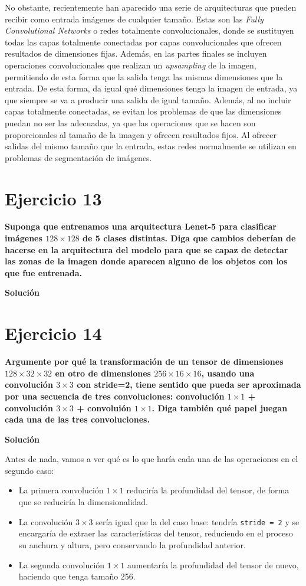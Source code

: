 \documentclass[11pt,a4paper]{article}
\newcommand{\answer}{\noindent\textbf{Solución}}
\newcommand{\question}[1]{\noindent\textbf{#1}}
\newcommand{\nonumsection}[1]{\section*{#1}\addcontentsline{toc}{section}{#1}}
\begin{document}
No obstante, recientemente han aparecido una serie de arquitecturas que pueden
recibir como entrada imágenes de cualquier tamaño. Estas son las \textit{Fully
Convolutional Networks} \cite{fcn} o redes totalmente convolucionales, donde se
sustituyen todas las capas totalmente conectadas por capas convolucionales que
ofrecen resultados de dimensiones fijas. Además,
en las partes finales se incluyen operaciones convolucionales que realizan un
\textit{upsampling} de la imagen, permitiendo de esta forma que la salida tenga las mismas
dimensiones que la entrada. De esta forma, da igual qué dimensiones tenga la imagen
de entrada, ya que siempre se va a producir una salida de igual tamaño.
Además, al no incluir capas totalmente conectadas, se evitan los problemas
de que las dimensiones puedan no ser las adecuadas, ya que las operaciones
que se hacen son proporcionales al tamaño de la imagen y ofrecen resultados
fijos. Al ofrecer salidas del mismo tamaño que la entrada, estas redes
normalmente se utilizan en problemas de segmentación de imágenes.

\nonumsection{Ejercicio 13}

\question{Suponga que entrenamos una arquitectura Lenet-5 para clasificar
imágenes $128 \times 128$ de 5 clases distintas. Diga que cambios deberían de
hacerse en la arquitectura del modelo para que se capaz de detectar
las zonas de la imagen donde aparecen alguno de los objetos con los
que fue entrenada.}

\answer

\nonumsection{Ejercicio 14}

\question{Argumente por qué la transformación de un tensor de dimensiones
$128 \times 32 \times 32$ en otro de dimensiones $256 \times 16 \times 16$,
usando una convolución $3 \times 3$ con stride=2, tiene sentido que pueda
ser aproximada por una secuencia de tres convoluciones: convolución $1 \times 1$
+ convolución $3 \times 3$ + convoluión $1 \times 1$. Diga también qué papel
juegan cada una de las tres convoluciones.}

\answer

Antes de nada, vamos a ver qué es lo que haría cada una de las operaciones en el
segundo caso:

\begin{itemize}[label=\textbullet]
  \item La primera convolución $1 \times 1$ reduciría la profundidad del tensor,
  de forma que se reduciría la dimensionalidad.
  \item La convolución $3 \times 3$  sería igual que la del caso base: tendría
  \texttt{stride = 2} y se encargaría de extraer las características del tensor,
  reduciendo en el proceso su anchura y altura, pero conservando la profundidad
  anterior.
  \item La segunda convolución $1 \times 1$ aumentaría la profundidad del tensor de
  nuevo, haciendo que tenga tamaño 256.
\end{itemize}
\end{document}
